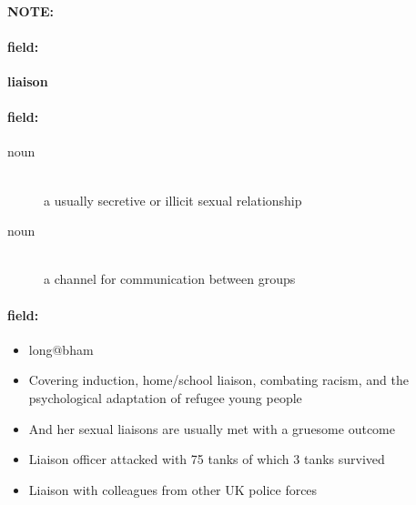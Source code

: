 \documentclass[12pt]{article}
\newenvironment{note}{\paragraph{NOTE:}}{}
\newenvironment{field}{\paragraph{field:}}{}
\begin{document}
\begin{note}
\begin{field}
\textbf{\large liaison}
\end{field}


\begin{field}
\begin{description}
\item[noun] \hfill \\ 
a usually secretive or illicit sexual relationship

\item[noun] \hfill \\ 
a channel for communication between groups

\end{description}
\end{field}

\begin{field}
\begin{itemize}
\item long@bham
\item Covering induction, home/school liaison, combating racism, and the psychological adaptation of refugee young people
\item And her sexual liaisons are usually met with a gruesome outcome
\item Liaison officer attacked with 75 tanks of which 3 tanks survived
\item Liaison with colleagues from other UK police forces
\end{itemize}
\end{field}
\end{note}
\end{document}
